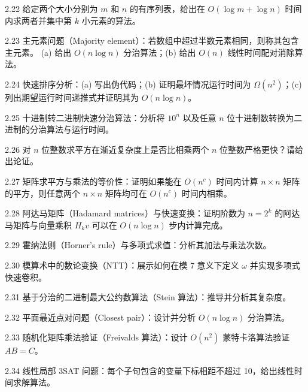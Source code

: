 \begin{exercise}{2.22}
给定两个大小分别为 $m$ 和 $n$ 的有序列表，给出在 $O(\log m + \log n)$ 时间内求两者并集中第 $k$ 小元素的算法。
\end{exercise}

\begin{exercise}{2.23}
主元素问题（Majority element）：若数组中超过半数元素相同，则称其包含主元素。
(a) 给出 $O(n \log n)$ 分治算法；(b) 给出 $O(n)$ 线性时间配对消除算法。
\end{exercise}

\begin{exercise}{2.24}
快速排序分析：(a) 写出伪代码；(b) 证明最坏情况运行时间为 $\Omega(n^2)$；(c) 列出期望运行时间递推式并证明其为 $O(n \log n)$。
\end{exercise}

\begin{exercise}{2.25}
十进制转二进制快速分治算法：分析将 $10^n$ 以及任意 $n$ 位十进制数转换为二进制的分治算法与运行时间。
\end{exercise}

\begin{exercise}{2.26}
对 $n$ 位整数求平方在渐近复杂度上是否比相乘两个 $n$ 位整数严格更快？请给出论证。
\end{exercise}

\begin{exercise}{2.27}
矩阵求平方与乘法的等价性：证明如果能在 $O(n^c)$ 时间内计算 $n \times n$ 矩阵的平方，则任意两个 $n \times n$ 矩阵均可在 $O(n^c)$ 时间内相乘。
\end{exercise}

\begin{exercise}{2.28}
阿达马矩阵（Hadamard matrices）与快速变换：证明阶数为 $n = 2^k$ 的阿达马矩阵与向量乘积 $H_k v$ 可以在 $O(n \log n)$ 步内计算完成。
\end{exercise}

\begin{exercise}{2.29}
霍纳法则（Horner's rule）与多项式求值：分析其加法与乘法次数。
\end{exercise}

\begin{exercise}{2.30}
模算术中的数论变换（NTT）：展示如何在模 7 意义下定义 $\omega$ 并实现多项式快速卷积。
\end{exercise}

\begin{exercise}{2.31}
基于分治的二进制最大公约数算法（Stein 算法）：推导并分析其复杂度。
\end{exercise}

\begin{exercise}{2.32}
平面最近点对问题（Closest pair）：设计并分析 $O(n \log n)$ 分治算法。
\end{exercise}

\begin{exercise}{2.33}
随机化矩阵乘法验证（Freivalds 算法）：设计 $O(n^2)$ 蒙特卡洛算法验证 $AB = C$。
\end{exercise}

\begin{exercise}{2.34}
线性局部 3SAT 问题：每个子句包含的变量下标相距不超过 10，给出线性时间求解算法。
\end{exercise}
